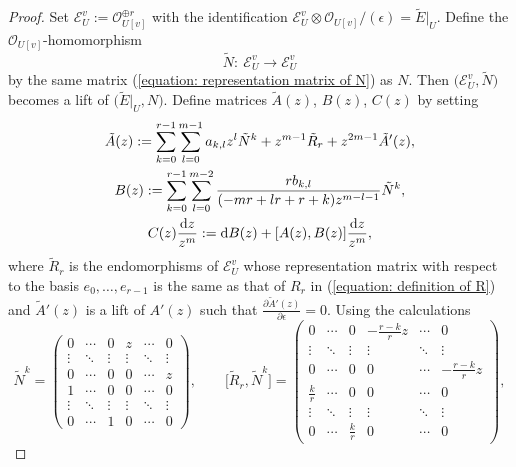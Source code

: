 \documentclass[pdftex]{sigma}
\numberwithin{equation}{section}
\begin{document}
\begin{proof}
Set ${\mathcal E}^v_U:={\mathcal O}_{U[v]}^{\oplus r}$ with
the identification
${\mathcal E}^v_U\otimes{\mathcal O}_{U[v]}/(\epsilon)=\tilde{E}|_U$.
Define the ${\mathcal O}_{U[v]}$-homomorphism
\[
 \tilde{N}\colon \ {\mathcal E}^v_U \longrightarrow {\mathcal E}^v_U
\]
by the same matrix (\ref{equation: representation matrix of N}) as $N$.
Then $\big({\mathcal E}^v_U,\tilde{N}\big)$ becomes a lift of $\big(\tilde{E}|_U, N\big)$.
Define matrices $\tilde{A}(z)$, $B(z)$, $C(z)$ by setting
\begin{gather*}
 \tilde{A}(z)
 :=
 \sum_{k=0}^{r-1}\sum_{l=0}^{m-1} a_{k,l} z^l \tilde{N}^k +
 z^{m-1}\tilde{R}_r+z^{2m-1}\tilde{A}'(z),
 \\
 B(z)
 :=
 \sum_{k=0}^{r-1}\sum_{l=0}^{m-2}
 \frac { r b_{k,l} } { (-mr+lr+r+k)z^{m-l-1} } \tilde{N}^k, \\
 C(z) \frac{{\rm d}z} {z^m}
 :=
 {\rm d}B(z)+ [A(z),B(z)]\frac{{\rm d}z} {z^m},
\end{gather*}
where $\tilde{R}_r$ is the endomorphisms of
${\mathcal E}^v_U$ whose representation matrix with respect to the basis
$e_0,\dots,e_{r-1}$ is the same as that of $R_r$ in (\ref{equation: definition of R})
and $\tilde{A}'(z)$
is a lift of $A'(z)$ such that
$\frac{\partial \tilde{A}'(z)}{\partial\epsilon}=0$.
Using the calculations
\begin{equation*}
 \tilde{N}^k
 =
 \begin{pmatrix}
 0 & \cdots & 0 & z & \cdots & 0 \\
 \vdots & \ddots & \vdots & \vdots & \ddots & \vdots \\
 0 & \cdots & 0 & 0 & \cdots & z \\
 1 & \cdots & 0 & 0 & \cdots & 0 \\
 \vdots & \ddots & \vdots & \vdots & \ddots & \vdots \\
 0 & \cdots & 1 & 0 & \cdots & 0
 \end{pmatrix},
 \qquad
 \big[ \tilde{R}_r,\tilde{N}^k \big]
 =
 \begin{pmatrix}
 0 & \cdots & 0 & -\frac {r-k} {r} z & \cdots & 0 \\
 \vdots & \ddots & \vdots & \vdots & \ddots & \vdots \\
 0 & \cdots & 0 & 0 & \cdots & -\frac {r-k} {r}z \\
 \frac {k} {r} & \cdots & 0 & 0 & \cdots & 0 \\
 \vdots & \ddots & \vdots & \vdots & \ddots & \vdots \\
 0 & \cdots & \frac {k} {r} & 0 & \cdots & 0
 \end{pmatrix},

\end{equation*}
\end{proof}
\end{document}
